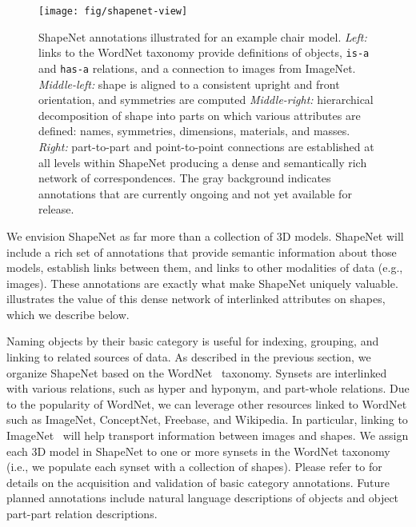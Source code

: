 \begin{figure*}
  \centering
  \texttt{[image: fig/shapenet-view]}
  \caption{\small{ShapeNet annotations illustrated for an example chair model. \emph{Left:} links to the WordNet taxonomy provide definitions of objects, \texttt{is-a} and \texttt{has-a} relations, and a connection to images from ImageNet. \emph{Middle-left:} shape is aligned to a consistent upright and front orientation, and symmetries are computed \emph{Middle-right:} hierarchical decomposition of shape into parts on which various attributes are defined: names, symmetries, dimensions, materials, and masses. \emph{Right:} part-to-part and point-to-point connections are established at all levels within ShapeNet producing a dense and semantically rich network of correspondences. The gray background indicates annotations that are currently ongoing and not yet available for release.}}
  \label{fig:shapenet-view}
\end{figure*}

We envision ShapeNet as far more than a collection of 3D models. ShapeNet will include a rich set of annotations that provide semantic information about those models, establish links between them, and links to other modalities of data (e.g., images). These annotations are exactly what make ShapeNet uniquely valuable.   illustrates the value of this dense network of interlinked attributes on shapes, which we describe below.

 Naming objects by their basic category is useful for indexing, grouping, and linking to related sources of data.  As described in the previous section, we organize ShapeNet based on the WordNet~\cite{miller:1995:wordnet} taxonomy.  Synsets are interlinked with various relations, such as hyper and hyponym, and part-whole relations.  Due to the popularity of WordNet, we can leverage other resources linked to WordNet such as ImageNet, ConceptNet, Freebase, and Wikipedia. In particular, linking to ImageNet~\cite{deng:2009:imagenet} will help transport information between images and shapes.  We assign each 3D model in ShapeNet to one or more synsets in the WordNet taxonomy (i.e., we populate each synset with a collection of shapes). Please refer to  for details on the acquisition and validation of basic category annotations.  Future planned annotations include natural language descriptions of objects and object part-part relation descriptions.

